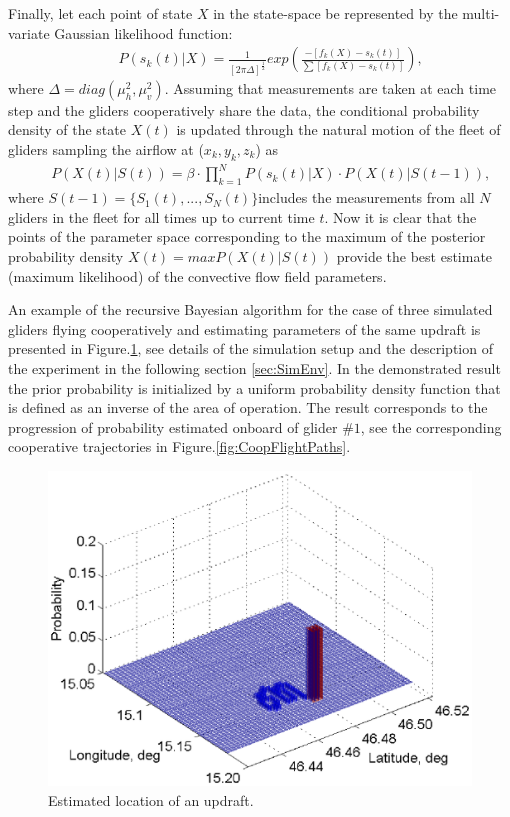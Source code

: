 \documentclass{ifacconf}
\begin{document}
Finally, let each point of state $X$ in the state-space be represented by the multi-variate Gaussian likelihood function:
\begin{eqnarray*}
    && P(s_k(t)\vert X)=\frac{1}{[2\pi \Delta]^\frac{1}{2}}  exp( \frac{-[f_k(X)-s_k(t)]}{\sum [f_k(X)-s_k(t)] }),
    \label{eq:BayesLikeLH}
\end{eqnarray*}
where $\Delta=diag(\mu^2_h,\mu^2_v)$. Assuming that measurements are taken at each time step and the gliders cooperatively share the data, the conditional probability density of the state $X(t)$ is updated through the natural motion of the fleet of gliders sampling the airflow at ($x_k,y_k,z_k$) as
\begin{eqnarray*}
    && P(X(t)\vert S(t))=\beta \cdot \prod_{k=1}^N P(s_k(t) \vert X)\cdot P(X(t) \vert S(t-1)),
    \label{eq:CondProb}
\end{eqnarray*}
where $S(t-1)=\{ S_1(t),...,S_N(t)\} $includes the measurements from all $N$ gliders in the fleet for all times up to current time $t$. Now it is clear that the points of the parameter space corresponding to the maximum of the posterior probability density $X(t)=max P(X(t) \vert S(t))$ provide the best estimate (maximum likelihood) of the convective flow field parameters.

An example of the recursive Bayesian algorithm for the case of three simulated gliders flying
cooperatively and estimating parameters of the same updraft is presented in Figure.\ref{fig:SimPDF}, see details of the simulation setup and the description of the experiment in the following section \ref{sec:SimEnv}. In the demonstrated result the prior probability is initialized by a uniform probability density function that is defined as an inverse of the area of operation. The result corresponds to the progression of probability estimated onboard of glider $\#1$, see the corresponding cooperative trajectories in Figure.\ref{fig:CoopFlightPaths}.

\begin{figure}[thpb]
  \centering
  \includegraphics[scale=0.625]{Figures/Mapping_thermals.eps}
  \caption{Estimated location of an updraft.}
  \label{fig:SimPDF}
\end{figure}
\end{document}
